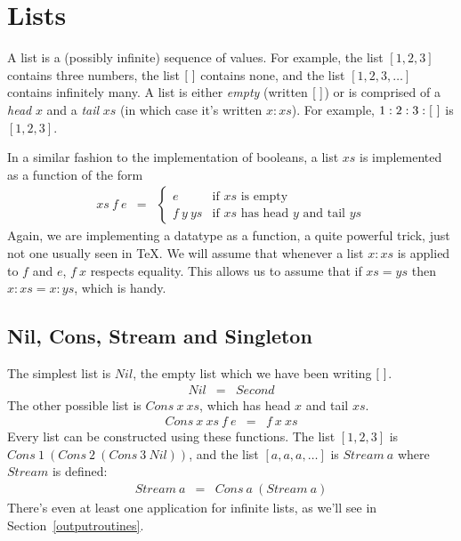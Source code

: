 \section{Lists}

A list is a (possibly infinite) sequence of values.  For example,
the list $[1,2,3]$ contains three numbers, the list $[\,\,]$ contains
none, and the list $[1,2,3,\ldots]$ contains infinitely many.
A list is either {\em empty\/} (written $[\,\,]$) or is comprised
of a {\em head\/}
$x$ and a {\em tail\/} $xs$ (in which case it's written $x:xs$).
For example, $1:2:3:[\,\,]$ is $[1,2,3]$.  

In a similar fashion to the implementation of booleans,
a list $xs$ is implemented as a function of the form
\begin{eqnarray*}
   xs~f~e  &
   =  &
   \left\{
      \begin{array}{ll}
         e       &  \mbox{if $xs$ is empty}  \\
         f~y~ys  &  \mbox{if $xs$ has head $y$ and tail $ys$}
      \end{array}
   \right.
\end{eqnarray*}
Again, we are implementing a datatype as a function, a quite powerful
trick, just not one usually seen in \TeX.  We will assume that
whenever a list $x:xs$ is applied to $f$ and $e$, $f~x$ respects equality.
This allows us to assume that if $xs = ys$ then $x:xs = x:ys$,
which is handy.  

\subsection{Nil, Cons, Stream and Singleton}

The simplest list is $Nil$, the empty list which we have been writing
$[\,\,]$.  
\begin{eqnarray*}
   Nil  &  =  &  Second
\end{eqnarray*}
The other possible list is $Cons~x~xs$, which has head $x$ and tail $xs$.
\begin{eqnarray*}
   Cons~x~xs~f~e  &  =  &  f~x~xs
\end{eqnarray*}
Every list can be constructed using these functions.
The list $[1,2,3]$ is $Cons~1~(Cons~2~(Cons~3~Nil))$, and the
list $[a,a,a,\ldots]$ is $Stream~a$ where $Stream$ is defined:
\begin{eqnarray*}
   Stream~a  &  =  &  Cons~a~(Stream~a)
\end{eqnarray*}
There's even at least one application for infinite lists,
as we'll see in Section~\ref{outputroutines}.

